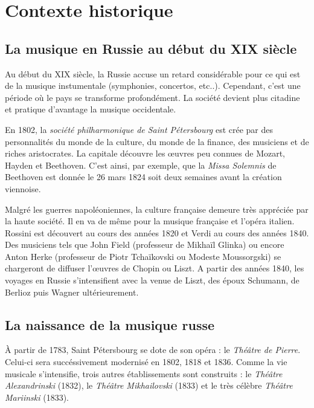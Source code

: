 
\chapter{Contexte historique}

\section{La musique en Russie au début du XIX\ieme{} siècle}

Au début du XIX\ieme{} siècle, la Russie accuse un retard considérable pour ce qui est de la musique instumentale (symphonies, concertos, etc..). Cependant, c'est une période où le pays se transforme profondément. La société devient plus citadine et pratique d'avantage la musique occidentale.

En 1802, la \emph{société philharmonique de Saint Pétersbourg} est crée par des personnalités du monde de la culture, du monde de la finance, des musiciens et de riches aristocrates. La capitale découvre les œuvres peu connues de Mozart, Hayden et Beethoven. C'est ainsi, par exemple, que la \emph{Missa Solemnis} de Beethoven est donnée le 26 mars 1824 soit deux semaines avant la création viennoise.

Malgré les guerres napoléoniennes, la culture française demeure très appréciée par la haute société. Il en va de même pour la musique française et l'opéra italien. Rossini est découvert au cours des années 1820 et Verdi au cours des années 1840. Des musiciens tels que John Field (professeur de Mikhaïl Glinka) ou encore Anton Herke (professeur de Piotr Tchaïkovski ou Modeste Moussorgski) se chargeront de diffuser l'œuvres de Chopin ou Liszt. A partir des années 1840, les voyages en Russie s'intensifient avec la venue de Liszt, des époux Schumann, de Berlioz puis Wagner ultérieurement.

\section{La naissance de la musique russe}

À partir de 1783, Saint Pétersbourg se dote de son opéra : le \emph{Théâtre de Pierre}. Celui-ci sera succéssivement modernisé en 1802, 1818 et 1836. Comme la vie musicale s'intensifie, trois autres établissements sont construits : le \emph{Théâtre Alexandrinski} (1832), le \emph{Théâtre Mikhailovski} (1833) et le très célèbre \emph{Théâtre Mariinski} (1833).

